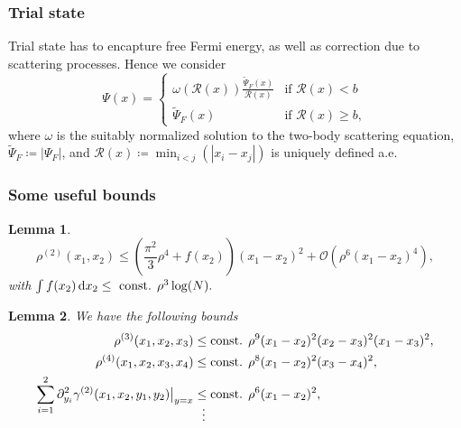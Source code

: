 \documentclass{beamer}[10]
\newcommand{\abs}[1]{\left\lvert #1 \right\rvert}
\newcommand*\diff{\mathop{}\!\mathrm{d}}
\newcommand{\rr}{\mathcal{R}}
\newtheorem{mlemma}{Lemma}
\begin{document}
\begin{frame}
	\frametitle{Trial state}
	\begin{block}{}
		Trial state has to encapture free Fermi energy, as well as correction due to scattering processes. Hence we consider $$
		\Psi(x)=\begin{cases}
		\omega(\rr(x))\frac{\tilde{\Psi}_F(x)}{\rr(x)}& \text{if }\rr(x)<b\\
		\tilde{\Psi}_F(x)&\text{if }\rr(x)\geq b,
		\end{cases}
		$$
		where $ \omega $ is the suitably normalized solution to the two-body scattering equation,  $ \tilde{\Psi}_F\coloneqq \abs{\Psi_F} $, and $ \rr(x)\coloneqq \min_{i<j}(\abs{x_i-x_j}) $ is uniquely defined a.e.
	\end{block}	
\end{frame}

\begin{frame}
	\frametitle{Some useful bounds}
	\begin{block}{}
		\vspace{-0.5cm}
		\footnotesize{\begin{mlemma}\label{Lemma rho2 bound}
			$$ \rho^{(2)}(x_1,x_2)\leq\left(\frac{\pi^2}{3}\rho^4+f(x_2)\right)(x_1-x_2)^2+\mathcal{O}(\rho^6(x_1-x_2)^4), $$ 
			with $ \int f(x_2)\diff x_2\leq \textnormal{ const. }\rho^3\log(N). $
		\end{mlemma}
			\begin{mlemma}\label{LemmaDensityBounds}
				We have the following bounds\begin{equation*}
				\begin{aligned}
				\rho^{(3)}(x_1,x_2,x_3)&\leq \textnormal{const. }\rho^9(x_1-x_2)^2(x_2-x_3)^2(x_1-x_3)^2,\\
				\rho^{(4)}(x_1,x_2,x_3,x_4)&\leq \textnormal{const. }\rho^8(x_1-x_2)^2(x_3-x_4)^2,\\
				\sum_{i=1}^{2}\partial_{y_i}^2\gamma^{(2)}(x_1,x_2,y_1,y_2)\big\rvert_{y=x}&\leq \textnormal{const. } \rho^{6}(x_1-x_2)^2,\\[-3.2ex]
				&\ \ \vdots
				\end{aligned}
				\end{equation*}
			\end{mlemma}	}
	\end{block}	
\end{frame}
\end{document}
